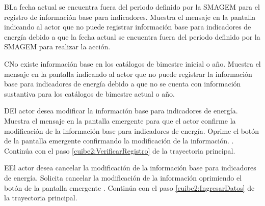    \begin{UCtrayectoriaA}{B}{La fecha actual se encuentra fuera del periodo definido por la SMAGEM para el registro de información base para indicadores.}
    \UCpaso[\UCsist] Muestra el mensaje  en la pantalla  indicando al actor que no puede registrar información base para indicadores de energía debido a que la fecha actual se encuentra fuera del periodo definido por la SMAGEM para realizar la acción. 
 \end{UCtrayectoriaA}
 
  \begin{UCtrayectoriaA}{C}{No existe información base en los catálogos de bimestre inicial o año.}
    \UCpaso[\UCsist] Muestra el mensaje  en la pantalla  indicando al actor que no puede registrar la información base para indicadores de energía debido a que no se cuenta con información sustantiva para los catálogos de bimestre actual o año.
 \end{UCtrayectoriaA}
 
  \begin{UCtrayectoriaA}{D}{El actor desea modificar la información base para indicadores de energía.}
    \UCpaso[\UCsist] Muestra el mensaje  en la pantalla emergente  para que el actor confirme la modificación de la información base para indicadores de energía.
    \UCpaso[\UCactor] Oprime el botón  de la pantalla emergente  confirmando la modificación de la información. .
    \UCpaso[] Continúa con el paso \ref{cuibe2:VerificarRegistro} de la trayectoria principal.    
 \end{UCtrayectoriaA}
 
   \begin{UCtrayectoriaA}{E}{El actor desea cancelar la modificación de la información base para indicadores de energía.}
    \UCpaso[\UCactor] Solicita cancelar la modificación de la información oprimiendo el botón  de la pantalla emergente .
    \UCpaso[] Continúa con el paso \ref{cuibe2:IngresarDatos} de la trayectoria principal.    
 \end{UCtrayectoriaA}
 
